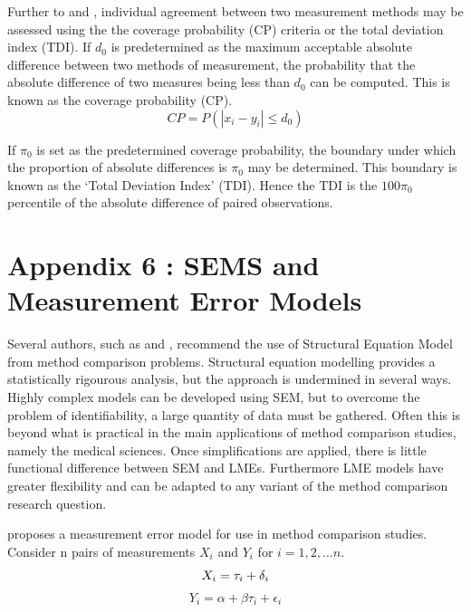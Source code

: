 \documentclass[12pt, a4paper]{report}
\theoremstyle{plain}
\theoremstyle{definition}
\theoremstyle{remark}
\begin{document}
Further to  \citet{lin2000} and \citet{lin2002}, individual agreement between two measurement methods may be
assessed using the the coverage probability (CP) criteria or the total deviation index (TDI). If $d_{0}$ is predetermined as the maximum acceptable absolute difference between two methods of measurement, the probability that the absolute difference of two measures being less than $d_{0}$ can be computed. This is known as the coverage probability (CP).
\begin{equation}
CP = P(|x_{i} - y_{i}| \leq d_{0})
\end{equation}

If $\pi_{0}$ is set as the predetermined coverage probability, the
boundary under which the proportion of absolute differences is
$\pi_{0}$ may be determined. This boundary is known as the `Total Deviation Index' (TDI). Hence the TDI is the $100\pi_{0}$
percentile of the absolute difference of paired observations.


\section{Appendix 6 : SEMS and Measurement Error Models}
Several authors, such as \citet{gkelly1985} and \citet{voelkel2005center}, recommend the use of Structural Equation Model from method comparison problems.
Structural equation modelling provides a statistically rigourous analysis, but the approach is undermined in several ways.  Highly complex models can be developed using SEM, but to overcome the problem of identifiability, a large quantity of data must be gathered. Often this is beyond what is practical in the main applications of method comparison studies, namely the medical sciences.  Once simplifications are applied, there is little functional difference between SEM and LMEs.
Furthermore LME models have greater flexibility and can be adapted to any variant of the method comparison research question.



\citet{DunnSEME} proposes a measurement error model for use in
method comparison studies. Consider n pairs of measurements
$X_{i}$ and $Y_{i}$ for $i=1,2,...n$.
\begin{equation}
X_{i} = \tau_{i}+\delta_{i}\\
\end{equation}
\begin{equation}
Y_{i} = \alpha +\beta\tau_{i}+\epsilon_{i} \nonumber
\end{equation}
\end{document}
